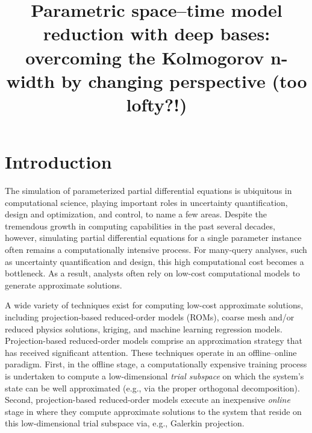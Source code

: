 \documentclass[3p,computermodern,10pt]{elsarticle}
\begin{document}
\begin{frontmatter}

\title{Parametric space--time model reduction with deep bases: overcoming the Kolmogorov n-width by changing perspective (too lofty?!)}

\begin{abstract}
\end{abstract}
\end{frontmatter}


\section{Introduction}
The simulation of parameterized partial differential equations is ubiquitous in computational science, playing important roles in uncertainty quantification, design and optimization, and control, to name a few areas. Despite the tremendous growth in computing capabilities in the past several decades, however, simulating partial differential equations for a single parameter instance often remains a computationally intensive process. For many-query analyses, such as uncertainty quantification and design, this high computational cost becomes a bottleneck. As a result, analysts often rely on low-cost computational models to generate approximate solutions. 

A wide variety of techniques exist for computing low-cost approximate solutions, including projection-based reduced-order models (ROMs), coarse mesh and/or reduced physics solutions, kriging, and machine learning regression models. Projection-based reduced-order models comprise an approximation strategy that has received significant attention. These techniques operate in an offline--online paradigm. First, in the offline stage, a computationally expensive training process is undertaken to compute a low-dimensional \textit{trial subspace} on which the system's state can be well approximated (e.g., via the proper orthogonal decomposition). Second, projection-based reduced-order models execute an inexpensive \textit{online} stage in where they compute approximate solutions to the system that reside on this low-dimensional trial subspace via, e.g., Galerkin projection. 
\end{document}
